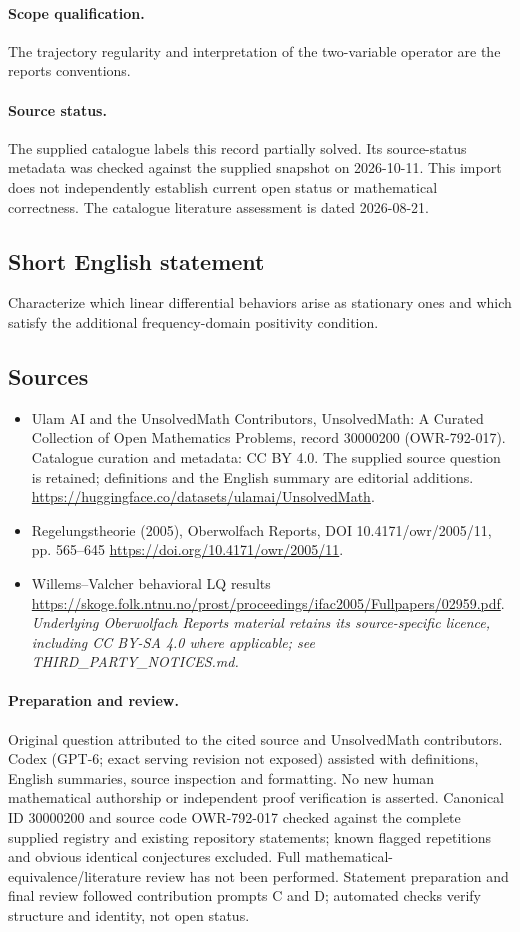 \documentclass[11pt]{article}
\begin{document}
\paragraph{Scope qualification.}
The trajectory regularity and interpretation of the two-variable operator are the report\textquotesingle s conventions.
\paragraph{Source status.}
The supplied catalogue labels this record partially solved. Its source-status metadata was checked against the supplied snapshot on 2026-10-11. This import does not independently establish current open status or mathematical correctness. The catalogue literature assessment is dated 2026-08-21.
\subsection{Short English statement}
Characterize which linear differential behaviors arise as stationary ones and which satisfy the additional frequency-domain positivity condition.
\subsection{Sources}
\begin{itemize}
\item[S1] Ulam AI and the UnsolvedMath Contributors, UnsolvedMath: A Curated Collection of Open Mathematics Problems, record 30000200 (OWR-792-017). Catalogue curation and metadata: CC BY 4.0. The supplied source question is retained; definitions and the English summary are editorial additions.
\url{https://huggingface.co/datasets/ulamai/UnsolvedMath}.
\item[S2] Regelungstheorie (2005), Oberwolfach Reports, DOI 10.4171/owr/2005/11, pp. 565--645
\url{https://doi.org/10.4171/owr/2005/11}.
\item[S3] Willems--Valcher behavioral LQ results
\url{https://skoge.folk.ntnu.no/prost/proceedings/ifac2005/Fullpapers/02959.pdf}.
\textit{Underlying Oberwolfach Reports material retains its source-specific licence, including CC BY-SA 4.0 where applicable; see THIRD\_PARTY\_NOTICES.md.}
\end{itemize}
\paragraph{Preparation and review.}
Original question attributed to the cited source and UnsolvedMath contributors. Codex (GPT-6; exact serving revision not exposed) assisted with definitions, English summaries, source inspection and formatting. No new human mathematical authorship or independent proof verification is asserted. Canonical ID 30000200 and source code OWR-792-017 checked against the complete supplied registry and existing repository statements; known flagged repetitions and obvious identical conjectures excluded. Full mathematical-equivalence/literature review has not been performed. Statement preparation and final review followed contribution prompts C and D; automated checks verify structure and identity, not open status.
\label{end:30000200}
\end{document}
